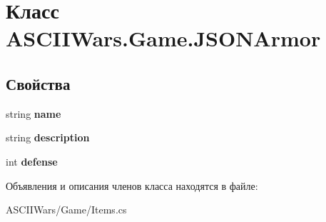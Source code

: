 \hypertarget{class_a_s_c_i_i_wars_1_1_game_1_1_j_s_o_n_armor}{}\section{Класс A\+S\+C\+I\+I\+Wars.\+Game.\+J\+S\+O\+N\+Armor}
\label{class_a_s_c_i_i_wars_1_1_game_1_1_j_s_o_n_armor}
\subsection*{Свойства}
\begin{DoxyCompactItemize}
\item 
\hypertarget{class_a_s_c_i_i_wars_1_1_game_1_1_j_s_o_n_armor_a5f29078c07ea3199d5e0e2aa48e5dd90}{}\label{class_a_s_c_i_i_wars_1_1_game_1_1_j_s_o_n_armor_a5f29078c07ea3199d5e0e2aa48e5dd90} 
string {\bfseries name}
\item 
\hypertarget{class_a_s_c_i_i_wars_1_1_game_1_1_j_s_o_n_armor_a078af0e88ca64ad7bad94897eb37ef0a}{}\label{class_a_s_c_i_i_wars_1_1_game_1_1_j_s_o_n_armor_a078af0e88ca64ad7bad94897eb37ef0a} 
string {\bfseries description}
\item 
\hypertarget{class_a_s_c_i_i_wars_1_1_game_1_1_j_s_o_n_armor_ab31e905e8ac9355508fd6476b414b301}{}\label{class_a_s_c_i_i_wars_1_1_game_1_1_j_s_o_n_armor_ab31e905e8ac9355508fd6476b414b301} 
int {\bfseries defense}
\end{DoxyCompactItemize}


Объявления и описания членов класса находятся в файле\+:\begin{DoxyCompactItemize}
\item 
A\+S\+C\+I\+I\+Wars/\+Game/Items.\+cs\end{DoxyCompactItemize}
